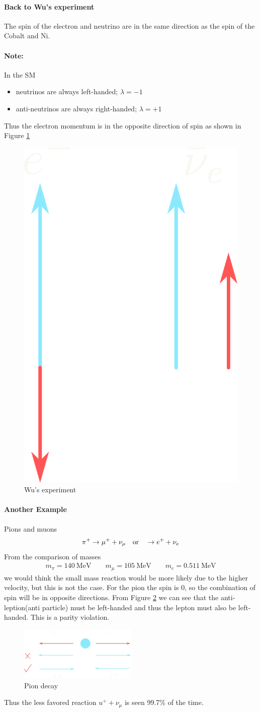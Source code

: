 \documentclass[../main.tex]{subfiles}
\begin{document}
\paragraph*{Back to Wu's experiment} The spin of the electron and neutrino are in the same direction 
as the spin of the Cobalt and Ni. 

\paragraph*{Note:}In the SM 
\begin{itemize}
    \item neutrinos are always left-handed; $\lambda = -1$
    \item anti-neutrinos are always right-handed; $\lambda = +1$
\end{itemize}

Thus the electron momentum is in the opposite direction of spin as shown in Figure \ref{fig:helicity}

\begin{figure}[ht]
    \centering
    \includegraphics[width=0.2\linewidth]{helicity.png}
    \caption{Wu's experiment}
    \label{fig:helicity}
\end{figure}

\paragraph*{Another Example} Pions and muons
\begin{align*}
    \pi^+ \to \mu^+ + \nu_\mu \qor  \to e^+ + \nu_e
\end{align*}
From the comparison of masses
\begin{align*}
    m_\pi = \qty{140}{\MeV} \qquad m_\mu = \qty{105}{\MeV} \qquad m_e = \qty{0.511}{\MeV}
\end{align*}
we would think the small mass reaction would be more likely due to the higher velocity, but this
is not the case. For the pion the spin is 0, so the combination of spin will be in opposite directions.
From Figure \ref{fig:pion_eg} we can see that the anti-leption(anti particle) must be left-handed
and thus the lepton must also be left-handed. This is a parity violation.
\begin{figure}[ht]
    \centering
    \includegraphics[width=0.5\textwidth]{pion_eg.png}
    \caption{Pion decay}
    \label{fig:pion_eg}
\end{figure}
Thus the less favored reaction $u^+ + \nu_\mu$ is seen 99.7\% of the time.
\end{document}
